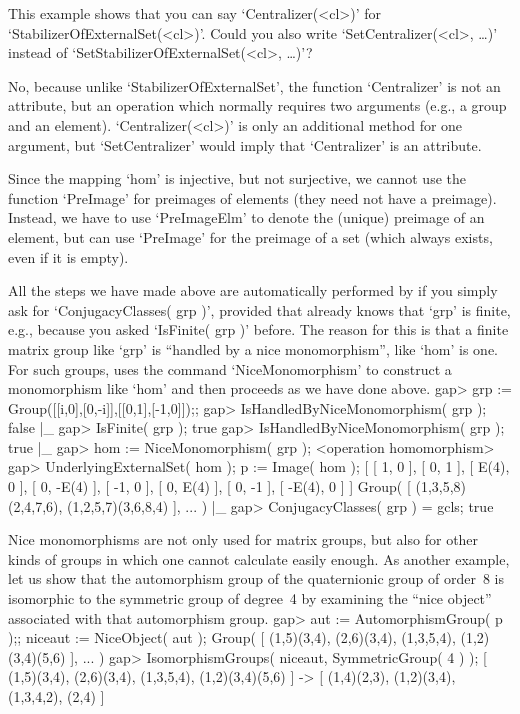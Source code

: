 \exercise This example  shows  that you can  say  `Centralizer(<cl>)' for
`StabilizerOfExternalSet(<cl>)'.   Could      you         also      write
`SetCentralizer(<cl>,         \dots)'        instead                   of
`SetStabilizerOfExternalSet(<cl>, \dots)'?

\answer   No, because    unlike `StabilizerOfExternalSet', the   function
`Centralizer'  is  not an   attribute, but  an  operation  which normally
requires     two  arguments   (e.g.,     a   group    and an    element).
`Centralizer(<cl>)' is only an additional  method  for one argument,  but
`SetCentralizer' would imply that `Centralizer' is an attribute.

Since the  mapping `hom' is injective, but  not surjective, we cannot use
the function `PreImage' for  preimages of elements  (they need not have a
preimage). Instead,  we have to use `PreImageElm'  to denote the (unique)
preimage of an element, but can use `PreImage'  for the preimage of a set
(which always exists, even if it is empty).

All the steps we have made above are automatically performed by {\GAP} if
you  simply   ask for `ConjugacyClasses(  grp  )',   provided that {\GAP}
already knows that  `grp' is finite,  e.g., because you asked  `IsFinite(
grp )'  before. The reason  for this is that a   finite matrix group like
`grp' is ``handled by a nice monomorphism'',  like `hom' is one. For such
groups,  {\GAP} uses  the command   `NiceMonomorphism'   to construct   a
monomorphism like `hom' and then proceeds as we have done above.
\beginexample
    gap> grp := Group([[i,0],[0,-i]],[[0,1],[-1,0]]);;
    gap> IsHandledByNiceMonomorphism( grp );
    false
|_
    gap> IsFinite( grp );
    true
    gap> IsHandledByNiceMonomorphism( grp );
    true
|_
    gap> hom := NiceMonomorphism( grp );
    <operation homomorphism>
    gap> UnderlyingExternalSet( hom ); p := Image( hom );
    [ [ 1, 0 ], [ 0, 1 ], [ E(4), 0 ], [ 0, -E(4) ], [ -1, 0 ],
      [ 0, E(4) ], [ 0, -1 ], [ -E(4), 0 ] ]
    Group( [ (1,3,5,8)(2,4,7,6), (1,2,5,7)(3,6,8,4) ], ... )
|_
    gap> ConjugacyClasses( grp ) = gcls;
    true
\endexample

Nice monomorphisms are   not only used  for matrix  groups, but  also for
other kinds of  groups  in which  one cannot calculate  easily enough. As
another   example, let  us    show that the   automorphism  group  of the
quaternionic  group of  order~8 is isomorphic  to  the symmetric group of
degree~4   by   examining  the ``nice   object''    associated with  that
automorphism group.
\beginexample
    gap> aut := AutomorphismGroup( p );; niceaut := NiceObject( aut );
    Group( [ (1,5)(3,4), (2,6)(3,4), (1,3,5,4), (1,2)(3,4)(5,6) ], ... )
    gap> IsomorphismGroups( niceaut, SymmetricGroup( 4 ) );
    [ (1,5)(3,4), (2,6)(3,4), (1,3,5,4), (1,2)(3,4)(5,6) ] -> 
    [ (1,4)(2,3), (1,2)(3,4), (1,3,4,2), (2,4) ]
\endexample

